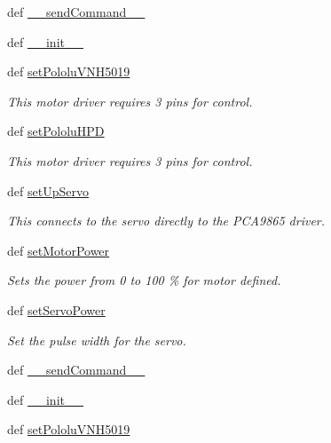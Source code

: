 \begin{DoxyCompactItemize}
def \hyperlink{classinterface_1_1MOTOR__CORE_1_1DC_a143580f4f51c92080dd75f2b70b56d2d}{\+\_\+\+\_\+send\+Command\+\_\+\+\_\+}
\item 
def \hyperlink{classinterface_1_1MOTOR__CORE_1_1DC_a7adcb2ca9d22b0a94b53a09347f9c2b7}{\+\_\+\+\_\+init\+\_\+\+\_\+}
\item 
def \hyperlink{classinterface_1_1MOTOR__CORE_1_1DC_a07432431affa760aec0760871db95d59}{set\+Pololu\+V\+N\+H5019}
\begin{DoxyCompactList}\small\item\em This motor driver requires 3 pins for control. \end{DoxyCompactList}\item 
def \hyperlink{classinterface_1_1MOTOR__CORE_1_1DC_a562d14585f151182842fe34106a1d88c}{set\+Pololu\+H\+P\+D}
\begin{DoxyCompactList}\small\item\em This motor driver requires 3 pins for control. \end{DoxyCompactList}\item 
def \hyperlink{classinterface_1_1MOTOR__CORE_1_1DC_a11b3993f834e3a032134faacc590ad6a}{set\+Up\+Servo}
\begin{DoxyCompactList}\small\item\em This connects to the servo directly to the P\+C\+A9865 driver. \end{DoxyCompactList}\item 
def \hyperlink{classinterface_1_1MOTOR__CORE_1_1DC_acd058e10f316149548b64f26a75f6dc5}{set\+Motor\+Power}
\begin{DoxyCompactList}\small\item\em Sets the power from 0 to 100 \% for motor defined. \end{DoxyCompactList}\item 
def \hyperlink{classinterface_1_1MOTOR__CORE_1_1DC_a9d0cb15bc32abd7e5ffef57a9d83c9b1}{set\+Servo\+Power}
\begin{DoxyCompactList}\small\item\em Set the pulse width for the servo. \end{DoxyCompactList}\item 
def \hyperlink{classinterface_1_1MOTOR__CORE_1_1DC_a143580f4f51c92080dd75f2b70b56d2d}{\+\_\+\+\_\+send\+Command\+\_\+\+\_\+}
\item 
def \hyperlink{classinterface_1_1MOTOR__CORE_1_1DC_a7adcb2ca9d22b0a94b53a09347f9c2b7}{\+\_\+\+\_\+init\+\_\+\+\_\+}
\item 
def \hyperlink{classinterface_1_1MOTOR__CORE_1_1DC_a07432431affa760aec0760871db95d59}{set\+Pololu\+V\+N\+H5019}

\end{DoxyCompactItemize}
